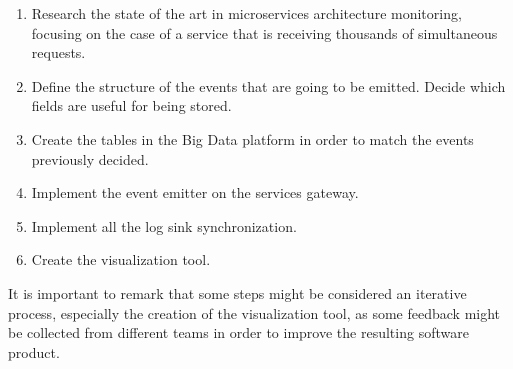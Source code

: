 \documentclass[12pt]{article}
\begin{document}
\begin{enumerate}
    \item Research the state of the art in microservices architecture monitoring, focusing on the case of a service that is receiving thousands of simultaneous requests.
    \item Define the structure of the events that are going to be emitted. Decide which fields are useful for being stored.
    \item Create the tables in the Big Data platform in order to match the events previously decided.
    \item Implement the event emitter on the services gateway.
    \item Implement all the log sink synchronization.
    \item Create the visualization tool.
\end{enumerate}

It is important to remark that some steps might be considered an iterative process, especially the creation of the visualization tool, as some feedback might be collected from different teams in order to improve the resulting software product.



\end{document}
